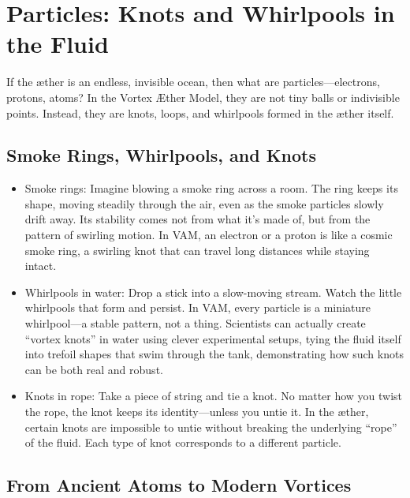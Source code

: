 
\section{Particles: Knots and Whirlpools in the Fluid}

If the æther is an endless, invisible ocean, then what are particles—electrons, protons, atoms? In the Vortex Æther Model, they are not tiny balls or indivisible points. Instead, they are knots, loops, and whirlpools formed in the æther itself.


\subsection*{Smoke Rings, Whirlpools, and Knots}

\begin{itemize}

\item
Smoke rings: Imagine blowing a smoke ring across a room. The ring keeps its shape, moving steadily through the air, even as the smoke particles slowly drift away. Its stability comes not from what it’s made of, but from the pattern of swirling motion. In VAM, an electron or a proton is like a cosmic smoke ring, a swirling knot that can travel long distances while staying intact.




\item
Whirlpools in water: Drop a stick into a slow-moving stream. Watch the little whirlpools that form and persist. In VAM, every particle is a miniature whirlpool—a stable pattern, not a thing. Scientists can actually create “vortex knots” in water using clever experimental setups, tying the fluid itself into trefoil shapes that swim through the tank, demonstrating how such knots can be both real and robust.




\item
Knots in rope: Take a piece of string and tie a knot. No matter how you twist the rope, the knot keeps its identity—unless you untie it. In the æther, certain knots are impossible to untie without breaking the underlying “rope” of the fluid. Each type of knot corresponds to a different particle.




\end{itemize}

\subsection*{From Ancient Atoms to Modern Vortices}

